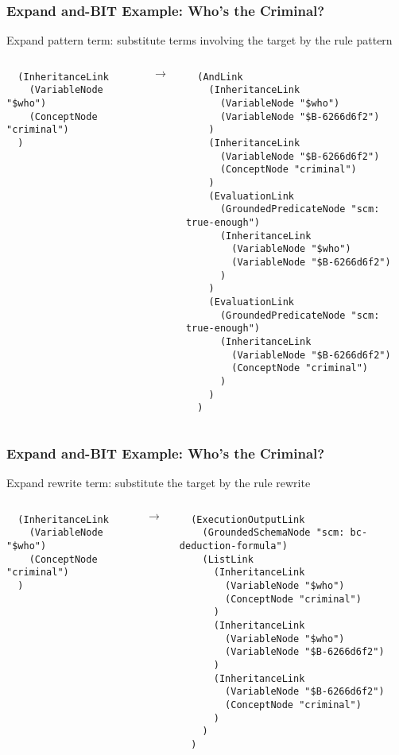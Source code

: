 \documentclass{beamer}
\begin{document}
\begin{frame}[fragile]
\frametitle{Expand and-BIT Example: Who's the Criminal?}

Expand pattern term: substitute terms involving the target by the rule pattern

  \begin{columns}

    \column{1in}

{\Tiny
\begin{verbatim}
  (InheritanceLink
    (VariableNode "$who")
    (ConceptNode "criminal")
  )
\end{verbatim}
}

    \column{0.5in}

$\rightarrow$

    \column{2in}

{\Tiny
\begin{verbatim}
  (AndLink
    (InheritanceLink
      (VariableNode "$who")
      (VariableNode "$B-6266d6f2")
    )
    (InheritanceLink
      (VariableNode "$B-6266d6f2")
      (ConceptNode "criminal")
    )
    (EvaluationLink
      (GroundedPredicateNode "scm: true-enough")
      (InheritanceLink
        (VariableNode "$who")
        (VariableNode "$B-6266d6f2")
      )
    )
    (EvaluationLink
      (GroundedPredicateNode "scm: true-enough")
      (InheritanceLink
        (VariableNode "$B-6266d6f2")
        (ConceptNode "criminal")
      )
    )
  )
\end{verbatim}
}

\end{columns}

\end{frame}

\begin{frame}[fragile]
\frametitle{Expand and-BIT Example: Who's the Criminal?}

Expand rewrite term: substitute the target by the rule rewrite

  \begin{columns}

    \column{1in}

{\Tiny
\begin{verbatim}
  (InheritanceLink
    (VariableNode "$who")
    (ConceptNode "criminal")
  )
\end{verbatim}
}

    \column{0.5in}

$\rightarrow$

    \column{2in}

{\Tiny
\begin{verbatim}
  (ExecutionOutputLink
    (GroundedSchemaNode "scm: bc-deduction-formula")
    (ListLink
      (InheritanceLink
        (VariableNode "$who")
        (ConceptNode "criminal")
      )
      (InheritanceLink
        (VariableNode "$who")
        (VariableNode "$B-6266d6f2")
      )
      (InheritanceLink
        (VariableNode "$B-6266d6f2")
        (ConceptNode "criminal")
      )
    )
  )
\end{verbatim}
}

\end{columns}

\end{frame}
\end{document}
